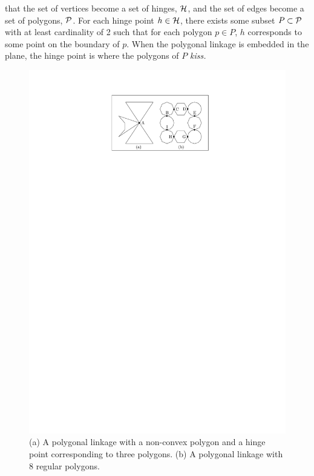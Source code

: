that the set of vertices become a set of hinges, ${\cal H}$, and the set of edges become a set of 
polygons, ${\cal P}$.  For each hinge point $h \in {\cal H}$, there exists some subset $P \subset {\cal P}$ with 
at least cardinality of 2 such that for each polygon $p \in P$, $h$ corresponds to some point on 
the boundary of $p$.  When the polygonal linkage is embedded in the plane, the hinge point is where 
the polygons of $P$ \it{kiss}.  
\begin{figure}[h]
\begin{center}
\includegraphics[scale=1]{graphics/PolygonalLinkageExamples.pdf}
\end{center} 
\caption{(a) A polygonal linkage with a non-convex polygon and a hinge point corresponding to three 
polygons.  (b) A polygonal linkage with 8 regular polygons.}
\label{fig:linkage-2}
\end{figure}
